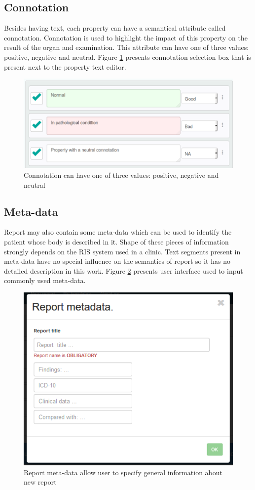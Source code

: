\documentclass[12pt, twoside, openany]{report}
\theoremstyle{definition}
\begin{document}
\subsection{Connotation}
Besides having text, each property can have a semantical attribute called connotation. Connotation is used to highlight the impact of this property on the result of the organ and examination. This attribute can have one of three values: positive, negative and neutral. Figure \ref{fig:property-connotation} presents connotation selection box that is present next to the property text editor.
\begin{figure}
	\centering
	\includegraphics[width=0.8\linewidth]{property-connotation}
	\caption{Connotation can have one of three values: positive, negative and neutral
		\label{fig:property-connotation}
	}
\end{figure}

\subsection{Meta-data}
Report may also contain some meta-data which can be used to identify the patient whose body is described in it. Shape of these pieces of information strongly depends on the RIS system used in a clinic. Text segments present in meta-data have no special influence on the semantics of report so it has no detailed description in this work. Figure \ref{fig:report-metadata} presents user interface used to input commonly used meta-data.
\begin{figure}
	\centering
	\includegraphics[width=0.6\linewidth]{report-metadata}
	\caption{Report meta-data allow user to specify general information about new report
    \label{fig:report-metadata}
	}
\end{figure}
\end{document}
